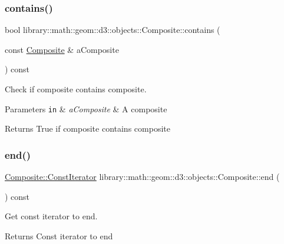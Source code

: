 \subsubsection{\texorpdfstring{contains()}{contains()}\hspace{0.1cm}{\footnotesize\ttfamily [2/2]}}
{\footnotesize\ttfamily bool library\+::math\+::geom\+::d3\+::objects\+::\+Composite\+::contains (\begin{DoxyParamCaption}\item[{const \hyperlink{classlibrary_1_1math_1_1geom_1_1d3_1_1objects_1_1_composite}{Composite} \&}]{a\+Composite }\end{DoxyParamCaption}) const}



Check if composite contains composite. 


\begin{DoxyParams}[1]{Parameters}
\mbox{\tt in}  & {\em a\+Composite} & A composite \\
\hline
\end{DoxyParams}
\begin{DoxyReturn}{Returns}
True if composite contains composite 
\end{DoxyReturn}
\mbox{\label{classlibrary_1_1math_1_1geom_1_1d3_1_1objects_1_1_composite_a17eb00b99b53fe9a483b05d7d4ef24aa}} 
\subsubsection{\texorpdfstring{end()}{end()}}
{\footnotesize\ttfamily \hyperlink{classlibrary_1_1math_1_1geom_1_1d3_1_1objects_1_1_composite_a52745f3c676ff98e099683b978253fc5}{Composite\+::\+Const\+Iterator} library\+::math\+::geom\+::d3\+::objects\+::\+Composite\+::end (\begin{DoxyParamCaption}{ }\end{DoxyParamCaption}) const}



Get const iterator to end. 

\begin{DoxyReturn}{Returns}
Const iterator to end 
\end{DoxyReturn}
\mbox{\label{classlibrary_1_1math_1_1geom_1_1d3_1_1objects_1_1_composite_ab97f7bd3d60450fc2f2b6a3b2a16cf5c}} 
